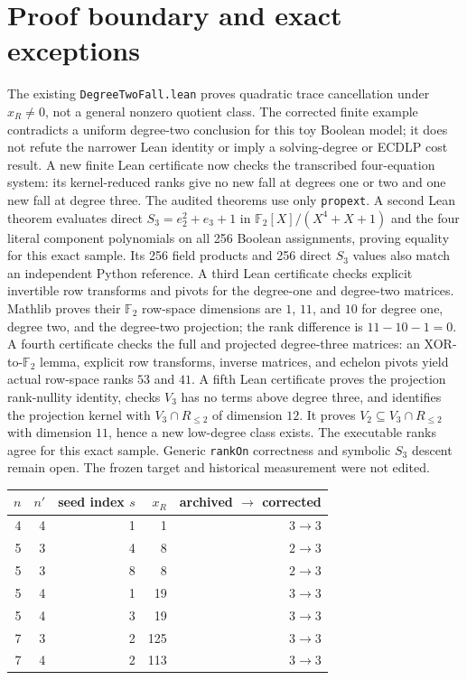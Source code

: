 \documentclass[10pt]{article}
\begin{document}
\clearpage
\section*{Proof boundary and exact exceptions}
The existing \texttt{DegreeTwoFall.lean} proves quadratic trace cancellation
under $x_R\ne0$, not a general nonzero quotient class. The corrected finite example
contradicts a uniform degree-two conclusion for this toy Boolean model; it
does not refute the narrower Lean identity or imply a solving-degree or ECDLP
cost result. A new finite Lean certificate
now checks the transcribed four-equation system: its kernel-reduced ranks give
no new fall at degrees one or two and one new fall at degree three. The audited
theorems use only \texttt{propext}. A second Lean theorem evaluates direct
$S_3=e_2^2+e_3+1$ in $\mathbb F_2[X]/(X^4+X+1)$ and the four literal component
polynomials on all 256 Boolean assignments, proving equality for this exact
sample. Its 256 field products and 256 direct $S_3$ values also match an
independent Python reference. A third Lean certificate checks explicit
invertible row transforms and pivots for the degree-one and degree-two
matrices. Mathlib proves their $\mathbb F_2$ row-space dimensions are
$1$, $11$, and $10$ for degree one, degree two, and the degree-two projection;
the rank difference is $11-10-1=0$. A fourth certificate checks the full and
projected degree-three matrices: an XOR-to-$\mathbb F_2$ lemma, explicit row
transforms, inverse matrices, and echelon pivots yield actual row-space ranks
$53$ and $41$. A fifth Lean certificate proves the projection rank-nullity
identity, checks $V_3$ has no terms above degree three, and identifies the
projection kernel with $V_3\cap R_{\le2}$ of dimension $12$. It proves
$V_2\subseteq V_3\cap R_{\le2}$ with dimension $11$, hence a new low-degree
class exists. The executable ranks agree for this exact sample. Generic
\texttt{rankOn} correctness and symbolic $S_3$ descent remain open. The frozen target
and historical measurement were not edited.

\begin{center}
\begin{tabular}{rrrrr}
\toprule
$n$ & $n'$ & seed index $s$ & $x_R$ & archived $\to$ corrected \\
\midrule
4 & 4 & 1 & 1 & $3\to3$ \\
5 & 3 & 4 & 8 & $2\to3$ \\
5 & 3 & 8 & 8 & $2\to3$ \\
5 & 4 & 1 & 19 & $3\to3$ \\
5 & 4 & 3 & 19 & $3\to3$ \\
7 & 3 & 2 & 125 & $3\to3$ \\
7 & 4 & 2 & 113 & $3\to3$ \\
\bottomrule
\end{tabular}
\end{center}
\end{document}
